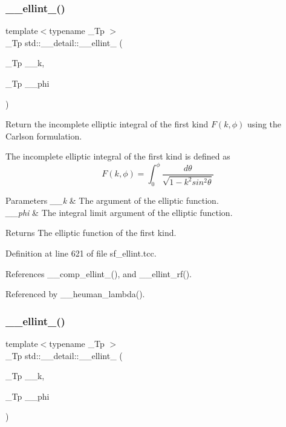 \subsubsection{\texorpdfstring{\+\_\+\+\_\+ellint\+\_()}{\_\_ellint\_1()}}
{\footnotesize\ttfamily template$<$typename \+\_\+\+Tp $>$ \\
\+\_\+\+Tp std\+::\+\_\+\+\_\+detail\+::\+\_\+\+\_\+ellint\+\_ (\begin{DoxyParamCaption}\item[{\+\_\+\+Tp}]{\+\_\+\+\_\+k,  }\item[{\+\_\+\+Tp}]{\+\_\+\+\_\+phi }\end{DoxyParamCaption})}



Return the incomplete elliptic integral of the first kind $ F(k,\phi) $ using the Carlson formulation. 

The incomplete elliptic integral of the first kind is defined as \[ F(k,\phi) = \int_0^{\phi}\frac{d\theta} {\sqrt{1 - k^2 sin^2\theta}} \]


\begin{DoxyParams}{Parameters}
{\em \+\_\+\+\_\+k} & The argument of the elliptic function. \\
\hline
{\em \+\_\+\+\_\+phi} & The integral limit argument of the elliptic function. \\
\hline
\end{DoxyParams}
\begin{DoxyReturn}{Returns}
The elliptic function of the first kind. 
\end{DoxyReturn}


Definition at line 621 of file sf\+\_\+ellint.\+tcc.



References \+\_\+\+\_\+comp\+\_\+ellint\+\_(), and \+\_\+\+\_\+ellint\+\_\+rf().



Referenced by \+\_\+\+\_\+heuman\+\_\+lambda().

\mbox{\label{namespacestd_1_1____detail_ad3687a38e74e5fbf08265501add0b56a}} 
\subsubsection{\texorpdfstring{\+\_\+\+\_\+ellint\+\_()}{\_\_ellint\_2()}}
{\footnotesize\ttfamily template$<$typename \+\_\+\+Tp $>$ \\
\+\_\+\+Tp std\+::\+\_\+\+\_\+detail\+::\+\_\+\+\_\+ellint\+\_ (\begin{DoxyParamCaption}\item[{\+\_\+\+Tp}]{\+\_\+\+\_\+k,  }\item[{\+\_\+\+Tp}]{\+\_\+\+\_\+phi }\end{DoxyParamCaption})}



